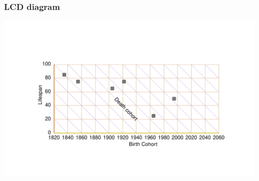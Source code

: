\documentclass[20pt]{beamer}
\begin{document}

\begin{frame}
\frametitle{LCD diagram}
\begin{center}
\includegraphics[trim= 200 200 200 200, scale=1.5]{Figures/LCDrt.pdf}
\end{center}
\end{frame}

\end{document}
